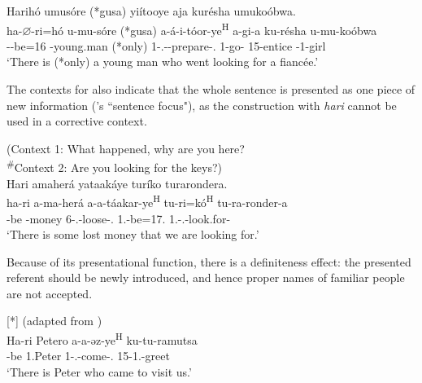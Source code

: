 \documentclass[output=paper]{langscibook}
\begin{document}
\z

\ea
\label{bkm:Ref75426224}
Harihó umusóre (*gusa) yiítooye aja kurésha umukoóbwa.\\
\gll
ha-$\varnothing$-ri=hó  u-mu-sóre  (*gusa)  a-á-i-tóor-ye\textsuperscript{H}   a-gi-a  ku-résha  u-mu-koóbwa \\
\EXP-\PRS-{}be=16  -young.man  (*only)  1\SM-\RMT.\PST-\REFL-{}prepare-\PFV.\REL{}   1\SM-{}go-\FV{}  {}15-{}entice \AUG{}-1-{}girl \\
\glt
  ‘There is (*only) a young man who went looking for a fiancée.’\\

\z

The contexts for  also indicate that the whole sentence is presented as one piece of new information (\citeauthor{Lambrecht1994}'s \citeyear{Lambrecht1994} ``sentence focus"), as the construction with \textit{hari} cannot be used in a corrective context.

\ea
\label{bkm:Ref75427022}
(Context 1: What happened, why are you here?\\
\textsuperscript{\#}Context 2: Are you looking for the keys?)\\
Hari amaherá yataakáye turíko turarondera.\\
\gll
ha-ri  a-ma-herá  a-a-táakar-ye\textsuperscript{H}  tu-ri=kó\textsuperscript{H}   tu-ra-ronder-a \\
\EXP{}-be  -money  6\SM-\N.\PST{}-loose-\PFV.\REL{}  1\PL.\SM{}-be=17.\REL{}   1\PL.\SM-\PRS.\DJ{}-look.for-\FV{} \\
\glt
  ‘There is some lost money that we are looking for.’\\

\z

Because of its presentational function, there is a definiteness effect: the presented referent should be newly introduced, and hence proper names of familiar people are not accepted.

\ea
[*]{
(adapted from )\\
\gll
Ha-ri  Petero  a-a-əz-ye\textsuperscript{H}  ku-tu-ramutsa\\
\EXP{}-be  1.Peter  1\SM-\N.\PST-{}come-\PFV.\REL{}  15-1\PL.\OM{}-greet\\
\glt
‘There is Peter who came to visit us.’\\
}
\end{document}
